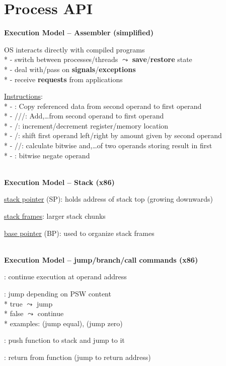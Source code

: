 \section{Process API}

\textbf{Execution Model -- Assembler (simplified)}
\begin{items}
  \item OS interacts directly with compiled programs \\*
    - switch between processes/threads \( \leadsto \) \textbf{save}/\textbf{restore} state \\*
    - deal with/pass on \textbf{signals}/\textbf{exceptions} \\*
    - receive \textbf{requests} from applications
  \item \underline{Instructions}: \\*
    - : Copy referenced data from second operand to first operand \\*
    - ///: Add,\dots from second operand to first operand \\*
    - /: increment/decrement register/memory location \\*
    - /: shift first operand left/right by amount given by second operand \\*
    - //: calculate bitwise and,\dots of two operands storing result in first \\*
    - : bitwise negate operand
\end{items}

\ \\
\textbf{Execution Model -- Stack (x86)}
\begin{items}
  \item \underline{stack pointer} (SP): holds address of stack top (growing downwards)
  \item \underline{stack frames}: larger stack chunks
  \item \underline{base pointer} (BP): used to organize stack frames
\end{items}

\ \\
\textbf{Execution Model -- jump/branch/call commands (x86)}
\begin{items}
  \item {}: continue execution at operand address
  \item {}: jump depending on PSW content \\*
    true \( \leadsto \) jump \\*
    false \( \leadsto \) continue \\*
    examples:  (jump equal),  (jump zero)
  \item {}: push function to stack and jump to it
  \item {}: return from function (jump to return address)
\end{items}

